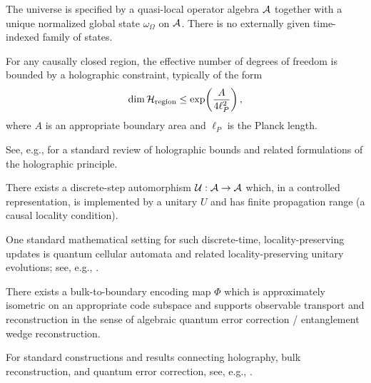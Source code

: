 \begin{axiom}
The universe is specified by a quasi-local operator algebra $\mathcal{A}$ together with a unique normalized global state $\omega_\Omega$ on $\mathcal{A}$. There is no externally given time-indexed family of states.
\end{axiom}

\begin{axiom}
For any causally closed region, the effective number of degrees of freedom is bounded by a holographic constraint, typically of the form
\begin{equation}
\dim \mathcal{H}_{\mathrm{region}} \le \exp\!\left(\frac{A}{4\ell_P^2}\right),
\end{equation}
where $A$ is an appropriate boundary area and $\ell_P$ is the Planck length.
\end{axiom}
\begin{remark}
See, e.g., \cite{Bousso2002} for a standard review of holographic bounds and related formulations of the holographic principle.
\end{remark}

\begin{axiom}
There exists a discrete-step automorphism $\mathcal{U}:\mathcal{A}\to\mathcal{A}$ which, in a controlled representation, is implemented by a unitary $U$ and has finite propagation range (a causal locality condition).
\end{axiom}
\begin{remark}
One standard mathematical setting for such discrete-time, locality-preserving updates is quantum cellular automata and related locality-preserving unitary evolutions; see, e.g., \cite{Arrighi2019QCAOverview,GrossNesmeVogtsWerner2012}.
\end{remark}

\begin{axiom}
There exists a bulk-to-boundary encoding map $\Phi$ which is approximately isometric on an appropriate code subspace and supports observable transport and reconstruction in the sense of algebraic quantum error correction / entanglement wedge reconstruction.
\end{axiom}
\begin{remark}
For standard constructions and results connecting holography, bulk reconstruction, and quantum error correction, see, e.g., \cite{AlmheiriDongHarlow2015,Pastawski2015,Harlow2017}.
\end{remark}

